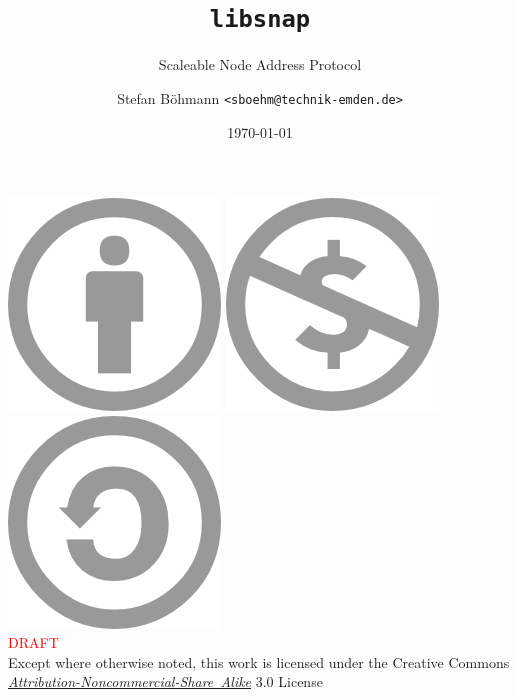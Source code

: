\documentclass[utf8x]{beamer}
\title[libsnap]{\texttt{libsnap}}
\subtitle{Scaleable Node Address Protocol}
\author[Stefan B\"ohmann | sboehm@technik-emden.de]{Stefan B\"ohmann \newline \scriptsize \texttt{<sboehm@technik-emden.de>}}
\institute[FH Emden/Leer]{Fachhochschule Emden/Leer}
\date{\today}
\begin{document}
\begin{frame}
    \thispagestyle{empty}
    \titlepage
    \vfill
    \begin{center}
        \includegraphics[scale=0.25]{images/cc-by-white.png}\hspace*{0.2ex}
        \includegraphics[scale=0.25]{images/cc-nc-white.png}\hspace*{0.2ex}
        \includegraphics[scale=0.25]{images/cc-sa-white.png}
        \\\textcolor{red}{DRAFT}
        \\\tiny 
        Except where otherwise noted, this work is licensed under the Creative Commons
        \textit{\textcolor{darkblue}{\href{http://creativecommons.org/licenses/by-nc-sa/3.0}{Attribution-Noncommercial-Share~Alike}}} 3.0 License
        \vspace*{0.5ex}
    \end{center}
\end{frame}


\end{document}
